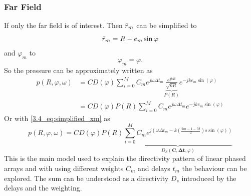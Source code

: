 \subsubsection{Far Field}
If only the far field is of interest. Then $\Bar{r}_{m}$ can be simplified to \cite{alma99116706330905515}
\begin{equation}
    \Bar{r}_{m} = R - e_m \sin{\varphi}
\end{equation}
and $\varphi_m$ to
\begin{equation}
    \varphi_m = \varphi.
\end{equation}
So the pressure can be approximately written as
\begin{align}
    p(R,\varphi,\omega) 
    &= 
    C D(\varphi) \sum_{i=0}^M C_m e^{j\omega \Delta t_m} \underbrace{\frac{e^{j k R}}{\sqrt{k R}}}_{P(R)}e^{-jke_m\sin{(\varphi)}} \\
    &= 
    C D(\varphi) P(R) \sum_{i=0}^M C_m e^{j\omega \Delta t_m} e^{-jke_m\sin{(\varphi)}}
\end{align}
Or with \ref{3.4_eq:simplified_xm} as
\begin{equation}
    p(R,\varphi,\omega) 
    = 
    C D(\varphi) P(R) \underbrace{\sum_{i=0}^M C_m e^{j (\omega \Delta t_m -k \left ( \frac{2m -1 - M}{2} \right )s \sin{(\varphi)} )}}_{D_S(\bm{C}, \bm{\Delta t} , \varphi)}
    \label{3_eq:beam_model_final}
\end{equation}
This is the main model used to explain the directivity pattern of linear phased arrays and with using different weights $C_m$ and delays $t_m$ the behaviour can be explored. The sum can be understood as a directivity $D_s$ introduced by the delays and the weighting. 

